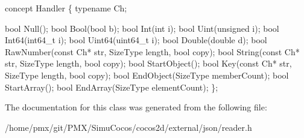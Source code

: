 \begin{DoxyCode}
concept Handler \{
    \textcolor{keyword}{typename} Ch;

    \textcolor{keywordtype}{bool} Null();
    \textcolor{keywordtype}{bool} Bool(\textcolor{keywordtype}{bool} b);
    \textcolor{keywordtype}{bool} Int(\textcolor{keywordtype}{int} i);
    \textcolor{keywordtype}{bool} Uint(\textcolor{keywordtype}{unsigned} i);
    \textcolor{keywordtype}{bool} Int64(int64\_t i);
    \textcolor{keywordtype}{bool} Uint64(uint64\_t i);
    \textcolor{keywordtype}{bool} Double(\textcolor{keywordtype}{double} d);
    \textcolor{keywordtype}{bool} RawNumber(\textcolor{keyword}{const} Ch* str, SizeType length, \textcolor{keywordtype}{bool} copy);
    \textcolor{keywordtype}{bool} String(\textcolor{keyword}{const} Ch* str, SizeType length, \textcolor{keywordtype}{bool} copy);
    \textcolor{keywordtype}{bool} StartObject();
    \textcolor{keywordtype}{bool} Key(\textcolor{keyword}{const} Ch* str, SizeType length, \textcolor{keywordtype}{bool} copy);
    \textcolor{keywordtype}{bool} EndObject(SizeType memberCount);
    \textcolor{keywordtype}{bool} StartArray();
    \textcolor{keywordtype}{bool} EndArray(SizeType elementCount);
\};
\end{DoxyCode}
 

The documentation for this class was generated from the following file\+:\begin{DoxyCompactItemize}
\item 
/home/pmx/git/\+P\+M\+X/\+Simu\+Cocos/cocos2d/external/json/reader.\+h\end{DoxyCompactItemize}
